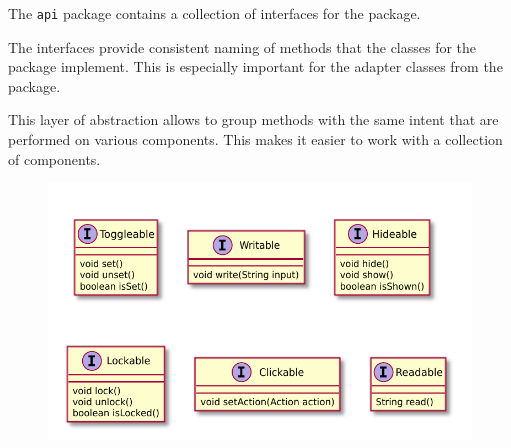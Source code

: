 The \texttt{api} package contains a collection of interfaces for the \texttt{} package.

The interfaces provide consistent naming of methods that the classes for the
\texttt{} package implement. This is especially important for
the adapter classes from the \texttt{} package.

This layer of abstraction allows to group methods with the same intent that are performed on
various components. This makes it easier to work with a collection of components.

\begin{figure}[H]
	\centering
	\includegraphics[width=\textwidth]{packageDiagrams/apiPackage}
\end{figure}
